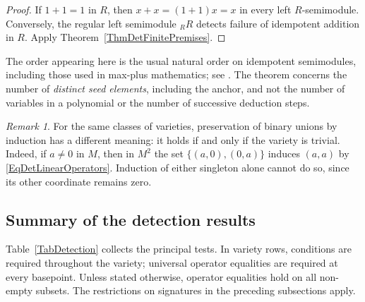 \documentclass[12pt,english]{amsart}
\theoremstyle{definition}
\numberwithin{equation}{section}
\theoremstyle{remark}
\newtheorem{remark}[theorem]{Remark}
\begin{document}
\begin{proof}
If $1+1=1$ in $R$, then $x+x=(1+1)x=x$ in every left
$R$-semimodule. Conversely, the regular left semimodule ${}_RR$
detects failure of idempotent addition in $R$. Apply
Theorem~\ref{ThmDetFinitePremises}.
\end{proof}

The order appearing here is the usual natural order on idempotent
semimodules, including those used in max-plus mathematics; see
\cite[Section~2.2]{DetCGQ04}. The theorem concerns the number of
\emph{distinct seed elements}, including the anchor, and not the
number of variables in a polynomial or the number of successive
deduction steps.

\begin{remark}\label{RemDetInductiveUnions}
For the same classes of varieties, preservation of binary unions by
induction has a different meaning: it holds if and only if the
variety is trivial. Indeed, if $a\ne0$ in $M$, then in $M^2$ the set
$\{(a,0),(0,a)\}$ induces $(a,a)$ by
\eqref{EqDetLinearOperators}. Induction of either singleton alone
cannot do so, since its other coordinate remains zero.
\end{remark}



\subsection{Summary of the detection results}

Table~\ref{TabDetection} collects the principal tests. In variety
rows, conditions are required throughout the variety; universal
operator equalities are required at every basepoint. Unless stated
otherwise, operator equalities hold on all non-empty subsets.
The restrictions on signatures in the preceding subsections apply.
\end{document}
